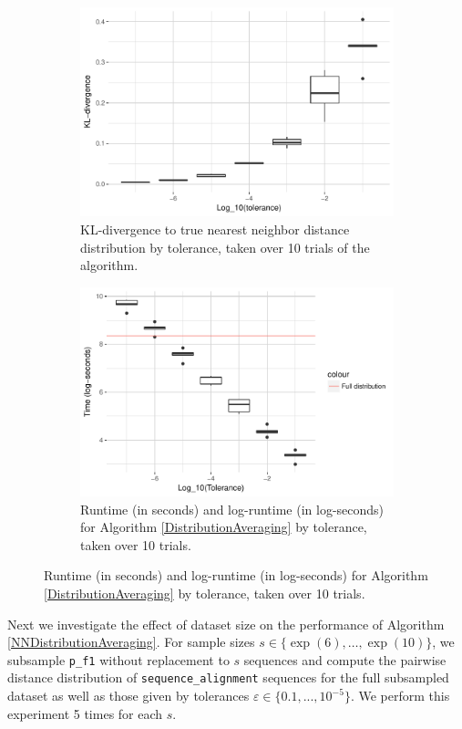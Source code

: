\documentclass{article}
\begin{document}
\begin{figure}
\begin{subfigure}{.49\textwidth}
        \includegraphics[width=\linewidth]{Figures/NearestNeighbor/Sequence/div_by_tol.pdf}
    	\caption{KL-divergence to true nearest neighbor distance distribution by tolerance, taken over 10 trials of the algorithm.}
    	\label{fig:NNDivergencesSequence}
	\end{subfigure}
    \begin{subfigure}{.49\textwidth}
    	\includegraphics[width=0.9\linewidth]{Figures/NearestNeighbor/Sequence/log_time_by_tol.pdf}
    	\caption{Runtime (in seconds) and log-runtime (in log-seconds) for Algorithm \ref{DistributionAveraging} by tolerance, taken over 10 trials.}
    	\label{fig:NNTimesSequence}
    \end{subfigure}
\end{figure}

Next we investigate the effect of dataset size on the performance of Algorithm \ref{NNDistributionAveraging}.
For sample sizes $s \in \{\exp(6), \dots, \exp(10)\}$, we subsample \texttt{p\_f1} without replacement to $s$ sequences and compute the pairwise distance distribution of \texttt{sequence\_alignment} sequences for the full subsampled dataset as well as those given by tolerances $\varepsilon \in \{0.1, ..., 10^{-5}\}$.
We perform this experiment 5 times for each $s$.
\end{document}
